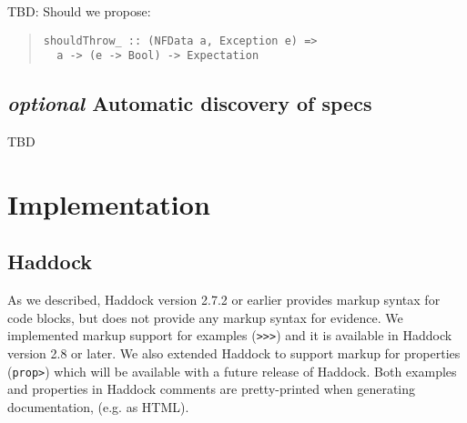 \documentclass[preprint]{sigplanconf}
\begin{document}
TBD: Should we propose:
\begin{quote}\small\begin{verbatim}
shouldThrow_ :: (NFData a, Exception e) =>
  a -> (e -> Bool) -> Expectation
\end{verbatim}\end{quote}

\subsection{\emph{optional} Automatic discovery of specs}
TBD


\section{Implementation}

\subsection{Haddock}

As we described, Haddock version 2.7.2 or earlier provides markup syntax for
code blocks, but does not provide any markup syntax for evidence.
We implemented markup support for examples ({\tt >>>}) and it is available in
Haddock version 2.8 or later.
We also extended Haddock to support markup for properties ({\tt prop>}) which
will be available with a future release of Haddock.
Both examples and properties in Haddock comments are pretty-printed when
generating documentation, (e.g. as HTML).



\end{document}

